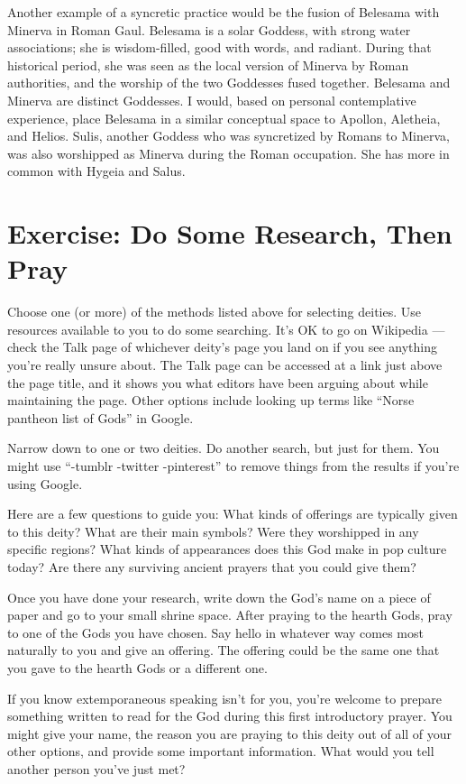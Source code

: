 \documentclass[
]{book}
\begin{document}
Another example of a syncretic practice would be the fusion of Belesama with Minerva in Roman Gaul. Belesama is a solar Goddess, with strong water associations; she is wisdom-filled, good with words, and radiant. During that historical period, she was seen as the local version of Minerva by Roman authorities, and the worship of the two Goddesses fused together. Belesama and Minerva are distinct Goddesses. I would, based on personal contemplative experience, place Belesama in a similar conceptual space to Apollon, Aletheia, and Helios. Sulis, another Goddess who was syncretized by Romans to Minerva, was also worshipped as Minerva during the Roman occupation. She has more in common with Hygeia and Salus.

\hypertarget{exercise-do-some-research-then-pray}{%
\section{Exercise: Do Some Research, Then Pray}\label{exercise-do-some-research-then-pray}}

Choose one (or more) of the methods listed above for selecting deities. Use resources available to you to do some searching. It's OK to go on Wikipedia --- check the Talk page of whichever deity's page you land on if you see anything you're really unsure about. The Talk page can be accessed at a link just above the page title, and it shows you what editors have been arguing about while maintaining the page. Other options include looking up terms like ``Norse pantheon list of Gods'' in Google.

Narrow down to one or two deities. Do another search, but just for them. You might use ``-tumblr -twitter -pinterest'' to remove things from the results if you're using Google.

Here are a few questions to guide you: What kinds of offerings are typically given to this deity? What are their main symbols? Were they worshipped in any specific regions? What kinds of appearances does this God make in pop culture today? Are there any surviving ancient prayers that you could give them?

Once you have done your research, write down the God's name on a piece of paper and go to your small shrine space. After praying to the hearth Gods, pray to one of the Gods you have chosen. Say hello in whatever way comes most naturally to you and give an offering. The offering could be the same one that you gave to the hearth Gods or a different one.

If you know extemporaneous speaking isn't for you, you're welcome to prepare something written to read for the God during this first introductory prayer. You might give your name, the reason you are praying to this deity out of all of your other options, and provide some important information. What would you tell another person you've just met?
\end{document}
